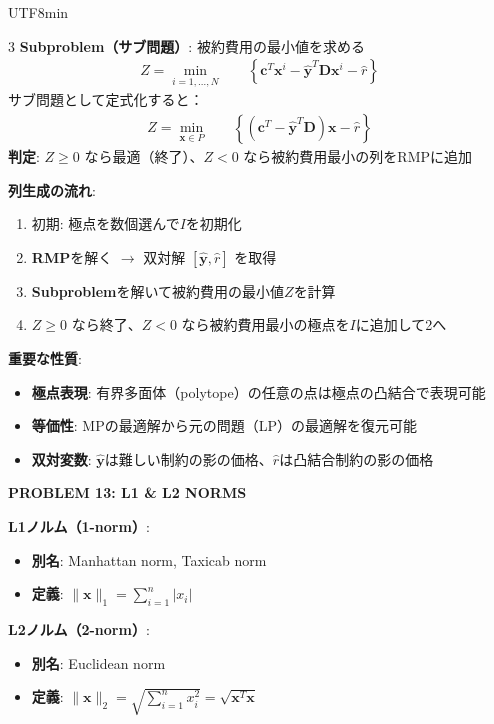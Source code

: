 \documentclass[8pt,a4paper]{article}
\newcommand{\mysection}[1]{\vspace{2pt}\textbf{#1}\vspace{1pt}}
\begin{document}
\begin{CJK}{UTF8}{min}
\begin{multicols}{3}
\textbf{Subproblem（サブ問題）}: 被約費用の最小値を求める
\begin{align*}
Z = \min_{i=1,\ldots,N} \quad & \left\{ \boldsymbol{c}^T \boldsymbol{x}^i - \hat{\boldsymbol{y}}^T \boldsymbol{D}\boldsymbol{x}^i - \hat{r} \right\}
\end{align*}
サブ問題として定式化すると：
\begin{align*}
Z = \min_{\boldsymbol{x} \in P} \quad & \left\{ (\boldsymbol{c}^T - \hat{\boldsymbol{y}}^T \boldsymbol{D}) \boldsymbol{x} - \hat{r} \right\}
\end{align*}
\textbf{判定}: $Z \geq 0$ なら最適（終了）、$Z < 0$ なら被約費用最小の列をRMPに追加

\textbf{列生成の流れ}:
\begin{enumerate}
    \item 初期: 極点を数個選んで$I$を初期化
    \item \textbf{RMP}を解く $\to$ 双対解 $[\hat{\boldsymbol{y}}, \hat{r}]$ を取得
    \item \textbf{Subproblem}を解いて被約費用の最小値$Z$を計算
    \item $Z \geq 0$ なら終了、$Z < 0$ なら被約費用最小の極点を$I$に追加して2へ
\end{enumerate}

\textbf{重要な性質}:
\begin{itemize}
    \item \textbf{極点表現}: 有界多面体（polytope）の任意の点は極点の凸結合で表現可能
    \item \textbf{等価性}: MPの最適解から元の問題（LP）の最適解を復元可能
    \item \textbf{双対変数}: $\hat{\boldsymbol{y}}$は難しい制約の影の価格、$\hat{r}$は凸結合制約の影の価格
\end{itemize}

\mysection{PROBLEM 13: L1 \& L2 NORMS}

\textbf{L1ノルム（1-norm）}:
\begin{itemize}
    \item \textbf{別名}: Manhattan norm, Taxicab norm
    \item \textbf{定義}: $\|\boldsymbol{x}\|_1 = \sum_{i=1}^n |x_i|$
\end{itemize}

\textbf{L2ノルム（2-norm）}:
\begin{itemize}
    \item \textbf{別名}: Euclidean norm
    \item \textbf{定義}: $\|\boldsymbol{x}\|_2 = \sqrt{\sum_{i=1}^n x_i^2} = \sqrt{\boldsymbol{x}^T \boldsymbol{x}}$
\end{itemize}


\end{multicols}
\end{CJK}
\end{document}
